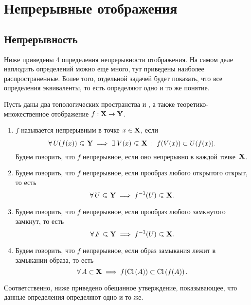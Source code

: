 \section{Непрерывные отображения}
\subsection{Непрерывность}
\begin{Note}
    Ниже приведены 4 определения непрерывности отображения. На самом деле наплодить определений можно еще много, тут приведены наиболее распространенные. Более того, отдельной задачей будет показать, что все определения эквиваленты, то есть определяют одно и то же понятие.
\end{Note}
\begin{Def}
    Пусть даны два топологических пространства \topX и \topY, а также теоретико-множественное отображение $f: \mathbf{X} \to \mathbf{Y}$. 
    \begin{enumerate}
        \item 
                $f$ называется непрерывным в точке $x\in \mathbf{X}$, если 
            \[
                \forall U({f(x)})\open \Y \implies \exists V(x) \open \X \st f(V(x)) \subset U(f(x)).
            \] 
                Будем говорить, что $f$ непрерывное, если оно непрерывно в каждой точке~$\mathbf{X}$.
        \item Будем говорить, что $f$ непрерывное, если прообраз любого открытого открыт, то есть
            \[
                \forall U \open \Y \implies \inv f (U) \open \X.
            \] 
        \item Будем говорить, что $f$ непрерывное, если прообраз любого замкнутого замкнут, то есть
            \[
                \forall F \closed \Y \implies \inv f (U) \closed \X.
            \] 
        \item Будем говорить, что $f$ непрерывное, если образ замыкания лежит в замыкании образа, то есть
            \[
                \forall A \subset \X \implies f(\cl A) \subset \cl{f(A)}.
            \] 
    \end{enumerate}
\end{Def}

Соответственно, ниже приведено обещанное утверждение, показывающее, что данные определения определяют одно и то же.

